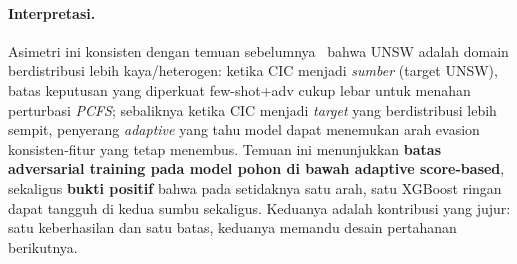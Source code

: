\documentclass[11pt,a4paper]{article}
\begin{document}
\paragraph{Interpretasi.} Asimetri ini konsisten dengan temuan
sebelumnya~\cite{martono2024sfm} bahwa UNSW adalah domain berdistribusi lebih
kaya/heterogen: ketika CIC menjadi \emph{sumber}
(target UNSW), batas keputusan yang diperkuat few-shot$+$adv cukup lebar untuk
menahan perturbasi \emph{PCFS}; sebaliknya ketika CIC menjadi
\emph{target} yang berdistribusi lebih sempit, penyerang \emph{adaptive} yang tahu
model dapat menemukan arah evasion konsisten-fitur yang tetap menembus. Temuan ini
menunjukkan \textbf{batas adversarial training pada model pohon di bawah
adaptive score-based}, sekaligus \textbf{bukti positif} bahwa pada setidaknya satu
arah, satu XGBoost ringan dapat tangguh di kedua sumbu sekaligus. Keduanya adalah
kontribusi yang jujur: satu keberhasilan dan satu batas, keduanya memandu desain
pertahanan berikutnya.
\end{document}
